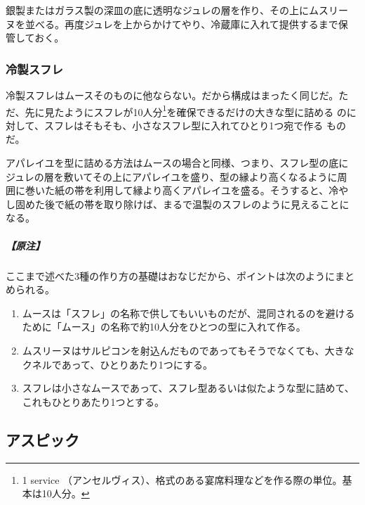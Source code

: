 \begin{recette}
銀製またはガラス製の深皿の底に透明なジュレの層を作り、その上にムスリー
ヌを並べる。再度ジュレを上からかけてやり、冷蔵庫に入れて提供するまで保
管しておく。

\hypertarget{souffles-froids}{%
\subsubsection{冷製スフレ}\label{souffles-froids}}



冷製スフレはムースそのものに他ならない。だから構成はまったく同じだ。た
だ、先に見たようにスフレが10人分\footnote{1 service
  （アンセルヴィス）、格式のある宴席料理などを作る際の単位。基本は10人分。}を確保できるだけの大きな型に詰める
のに対して、スフレはそもそも、小さなスフレ型に入れてひとり1つ宛で作る
ものだ。

アパレイユを型に詰める方法はムースの場合と同様、つまり、スフレ型の底に
ジュレの層を敷いてその上にアパレイユを盛り、型の縁より高くなるように周
囲に巻いた紙の帯を利用して縁より高くアパレイユを盛る。そうすると、冷や
し固めた後で紙の帯を取り除けば、まるで温製のスフレのように見えることに
なる。

\hypertarget{nota-souffles-froids}{%
\subparagraph{【原注】}\label{nota-souffles-froids}}

ここまで述べた3種の作り方の基礎はおなじだから、ポイントは次のようにまとめられる。

\begin{enumerate}
\def\labelenumi{\arabic{enumi}.}
\item
  ムースは「スフレ」の名称で供してもいいものだが、混同されるのを避けるために「ムース」の名称で約10人分をひとつの型に入れて作る。
\item
  ムスリーヌはサルピコンを射込んだものであってもそうでなくても、大きなクネルであって、ひとりあたり1つにする。
\item
  スフレは小さなムースであって、スフレ型あるいは似たような型に詰めて、これもひとりあたり1つとする。
\end{enumerate}
\end{recette}
\hypertarget{aspics}{%
\subsection{アスピック}\label{aspics}}

